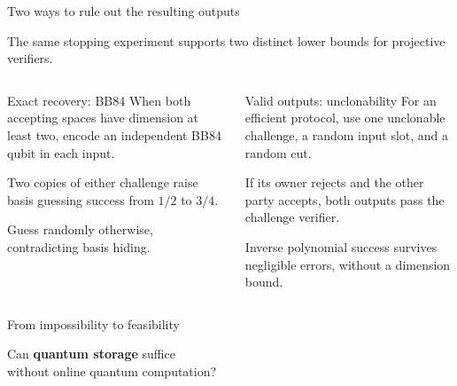\documentclass[aspectratio=169,11pt]{beamer}
\begin{document}
\begin{frame}{Two ways to rule out the resulting outputs}
\small
\setlength{\parskip}{0pt}

The same stopping experiment supports two distinct lower bounds for projective verifiers.

\medskip
\begin{columns}[T,onlytextwidth]
    \begin{block}{Exact recovery: BB84}
        When both accepting spaces have dimension at least two, encode an independent BB84 qubit in each input.

        \smallskip
        Two copies of either challenge raise basis guessing success from $1/2$ to $3/4$.

        \smallskip
        Guess randomly otherwise, contradicting basis hiding.
    \end{block}

    \begin{exampleblock}{Valid outputs: unclonability}
        For an efficient protocol, use one unclonable challenge, a random input slot, and a random cut.

        \smallskip
        If its owner rejects and the other party accepts, both outputs pass the challenge verifier.

        \smallskip
        Inverse polynomial success survives negligible errors, without a dimension bound.
    \end{exampleblock}
\end{columns}
\end{frame}%

\fi

\begin{frame}[c]{From impossibility to feasibility}
\centering

{\LARGE
Can \textbf{quantum storage} suffice\\[0.4em]
without online quantum computation?
\par}



\end{frame}
\end{document}
